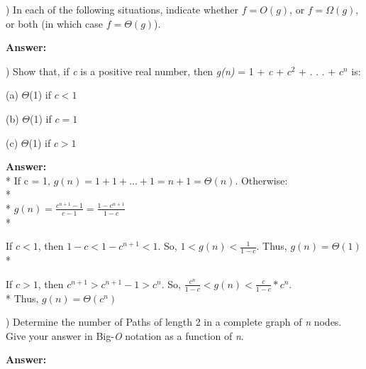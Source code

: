 \documentclass{article}
\begin{document}

\vspace{.2in}


\vspace{.2in}
) In each of the following situations, indicate whether $f  = O(g)$, or $f = \Omega(g)$, 
\indent or both (in which case $f = \Theta(g)$).

\vspace{.1in}
{\bf Answer:}


\vspace{.5in}
) Show that, if \textit{c} is a positive real number, then \textit{g(n)} = 1 + \textit{c} + $c^2$ + . . . + 
\indent$c^n$ is:

\vspace{.1in}
\indent (a) $\Theta$(1) if $c < 1$

\indent (b) $\Theta$(1) if $c = 1$

\indent (c) $\Theta$(1) if $c > 1$

\vspace{.1in}
{\bf Answer:}
\\* \indent If c = 1, $g(n) = 1 + 1 + . . .  + 1 = n + 1 = \Theta(n)$. Otherwise:
\\* \\* \indent \indent \indent $g(n) = \frac{c^{n + 1} - 1}{c - 1} = \frac{1 - c^{n + 1}}{1 - c}$ \\* 

\indent If $c < 1$, then $1 - c < 1 - c^{n + 1} < 1$. So, $1 < g(n) < \frac{1}{1 - c}$. Thus, $g(n) = \Theta(1)$ \\*

\indent If $c > 1$, then $c^{n + 1} > c^{n + 1} - 1 > c^n$. So, $\frac{c^n}{1 - c} < g(n) < \frac{c}{1 - c} * c^n$. \\*
\indent Thus, $g(n) = \Theta(c^n)$

\vspace{.5in}
) Determine the number of Paths of length 2 in a complete graph of \textit{n} nodes.
\indent Give your answer in Big-\textit{O} notation as a function of \textit{n}.

\vspace{.1in}
{\bf Answer:}
\end{document}
